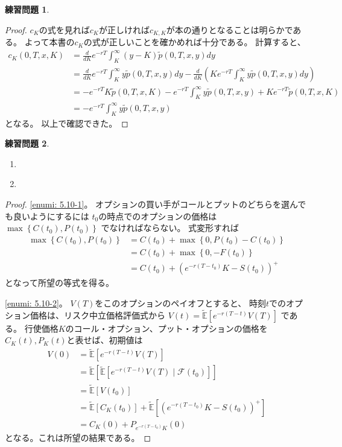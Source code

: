 \documentclass[uplatex]{jsarticle}
\theoremstyle{definition}
\newtheorem{prob}[prob]{練習問題}
\def\E{\mathbb{E}}
\def\mcF{\mathcal{F}}
\begin{document}
\begin{prob}\label{prob: 5.9}

\end{prob}

\begin{proof}
  \(c_K\)の式を見れば\(c_K\)が正しければ\(c_{K,K}\)が本の通りとなることは明らかである。
  よって本書の\(c_K\)の式が正しいことを確かめれば十分である。
  計算すると、
  \begin{align*}
    c_K(0,T,x,K) &= \frac{d}{dK}e^{-rT}\int_K^{\infty}(y-K)\tilde{p}(0,T,x,y) dy \\
    &= \frac{d}{dK}e^{-rT}\int_K^{\infty}y\tilde{p}(0,T,x,y) dy
    -\frac{d}{dK}\left(Ke^{-rT}\int_K^{\infty}y\tilde{p}(0,T,x,y) dy\right) \\
    &= -e^{-rT}K\tilde{p}(0,T,x,K)
    - e^{-rT}\int_K^{\infty}y\tilde{p}(0,T,x,y)
    + Ke^{-rT}\tilde{p}(0,T,x,K) \\
    &= - e^{-rT}\int_K^{\infty}y\tilde{p}(0,T,x,y)
  \end{align*}
  となる。
  以上で確認できた。
\end{proof}


\begin{prob}\label{prob: 5.10}
  \begin{enumerate}
    \item \label{enumi: 5.10-1}
    \item \label{enumi: 5.10-2}
  \end{enumerate}
\end{prob}

\begin{proof}
  \ref{enumi: 5.10-1}。
  オプションの買い手がコールとプットのどちらを選んでも良いようにするには
  \(t_0\)の時点でのオプションの価格は
  \(\max\left\{ C(t_0),P(t_0)\right\}\)
  でなければならない。
  式変形すれば
  \begin{align*}
    \max\left\{ C(t_0),P(t_0) \right\}
    &= C(t_0) + \max\left\{ 0, P(t_0)-C(t_0) \right\} \\
    &= C(t_0) + \max\left\{ 0, -F(t_0) \right\} \\
    &= C(t_0) + \left( e^{-r(T-t_0)}K-S(t_0) \right)^+
  \end{align*}
  となって所望の等式を得る。

  \ref{enumi: 5.10-2}。
  \(V(T)\)をこのオプションのペイオフとすると、
  時刻\(t\)でのオプション価格は、リスク中立価格評価式から
  \(V(t) = \tilde{\E}[e^{-r(T-t)}V(T)]\)
  である。
  行使価格\(K\)のコール・オプション、プット・オプションの価格を
  \(C_K(t),P_K(t)\)と表せば、初期値は
  \begin{align*}
    V(0) &= \tilde{\E}[e^{-r(T-t)}V(T)] \\
    &= \tilde{\E}\left[\tilde{\E}\left[
    e^{-r(T-t)}V(T)\mid\mcF(t_0)\right]\right] \\
    &= \tilde{\E}\left[ V(t_0) \right] \\
    &= \tilde{\E}\left[ C_K(t_0)\right] +
    \tilde{\E}\left[ \left( e^{-r(T-t_0)}K - S(t_0) \right)^+\right] \\
    &= C_K(0) + P_{e^{-r(T-t_0)}K}(0)
  \end{align*}
  となる。これは所望の結果である。
\end{proof}
\end{document}
